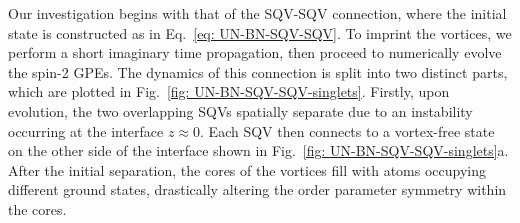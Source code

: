 Our investigation begins with that of the SQV-SQV connection, where the initial
state is constructed as in Eq.~\eqref{eq: UN-BN-SQV-SQV}.
To imprint the vortices, we perform a short imaginary time propagation, then
proceed to numerically evolve the spin-2 GPEs.
The dynamics of this connection is split into two distinct parts, which are
plotted in Fig.~\ref{fig: UN-BN-SQV-SQV-singlets}.
Firstly, upon evolution, the two overlapping SQVs spatially separate due to an
instability occurring at the interface \(z \approx 0\).
Each SQV then connects to a vortex-free state on the other side of the
interface shown in Fig.~\ref{fig: UN-BN-SQV-SQV-singlets}a.
After the initial separation, the cores of the vortices fill with atoms
occupying different ground states, drastically altering the order parameter
symmetry within the cores.
\begin{figure}
    \centering
\end{figure}
